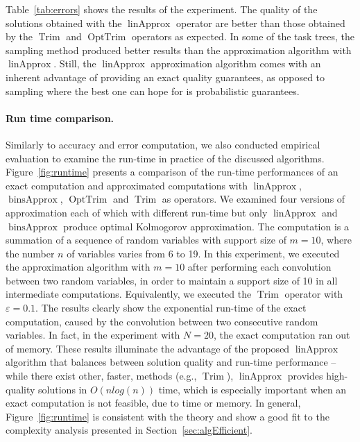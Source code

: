 \documentclass[letterpaper]{article} %
\DeclareMathOperator{\Trim}{Trim}
\DeclareMathOperator{\KlmApprox}{linApprox}
\DeclareMathOperator{\BinsApprox}{binsApprox}
\DeclareMathOperator{\OptTrim}{OptTrim}
\begin{document}
Table~\ref{tab:errors} shows the results of the experiment. The quality of the solutions obtained with the $\KlmApprox$ operator are better than those obtained by the $\Trim$ and $\OptTrim$ operators as expected. In some of the task trees, the sampling method produced better results than the approximation algorithm with $\KlmApprox$. Still, the $\KlmApprox$ approximation algorithm comes with an inherent advantage of providing an exact quality guarantees, as opposed to sampling where the best one can hope for is probabilistic guarantees.

\paragraph{Run time comparison.}
Similarly to accuracy and error computation, we also conducted empirical evaluation to examine the run-time in practice of the discussed algorithms. Figure~\ref{fig:runtime} presents a comparison of the run-time performances of an exact computation and approximated computations with $\KlmApprox$, $\BinsApprox$, $\OptTrim$ and $\Trim$ as operators. We examined four versions of approximation each of which with different run-time but only $\KlmApprox$ and $\BinsApprox$ produce optimal Kolmogorov approximation. The computation is a summation of a sequence of random variables with support size of $m{=}10$, where the number $n$ of variables varies from 6 to 19. In this experiment, we executed the approximation algorithm with $m{=}10$ after performing each convolution between two random variables, in order to maintain a support size of 10 in all intermediate computations. Equivalently, we executed the $\Trim$ operator with $\varepsilon=0.1$.
The results clearly show the exponential run-time of the exact computation, caused by the convolution between two consecutive random variables. In fact, in the experiment with $N{=}20$, the exact computation ran out of memory. These results illuminate the advantage of the proposed $\KlmApprox$ algorithm that balances between solution quality and run-time performance -- while there exist other, faster, methods (e.g., $\Trim$), $\KlmApprox$ provides high-quality solutions in $O(n log(n))$ time, which is especially important when an exact computation is not feasible, due to time or memory. In general, Figure~\ref{fig:runtime} is consistent with the theory and show a good fit to the complexity analysis presented in Section~\ref{sec:algEfficient}.  
\end{document}
